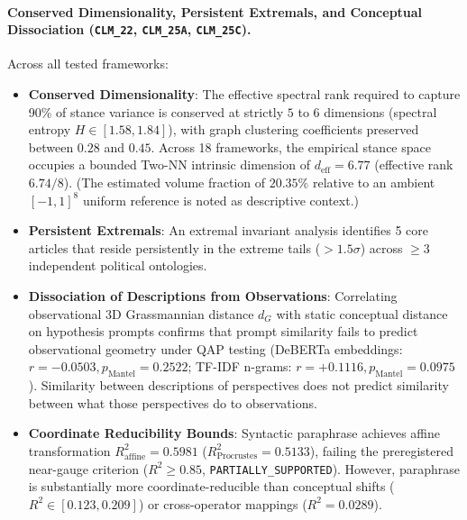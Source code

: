 \paragraph{Conserved Dimensionality, Persistent Extremals, and Conceptual Dissociation (\texttt{CLM\_22}, \texttt{CLM\_25A}, \texttt{CLM\_25C}).}
Across all tested frameworks:
\begin{itemize}
    \item \textbf{Conserved Dimensionality}: The effective spectral rank required to capture 90\% of stance variance is conserved at strictly $5$ to $6$ dimensions (spectral entropy $H \in [1.58, 1.84]$), with graph clustering coefficients preserved between $0.28$ and $0.45$. Across 18 frameworks, the empirical stance space occupies a bounded Two-NN intrinsic dimension of $d_{\text{eff}} = 6.77$ (effective rank $6.74/8$). (The estimated volume fraction of $20.35\%$ relative to an ambient $[-1,1]^8$ uniform reference is noted as descriptive context.)
    \item \textbf{Persistent Extremals}: An extremal invariant analysis identifies 5 core articles that reside persistently in the extreme tails ($> 1.5\sigma$) across $\ge 3$ independent political ontologies.
    \item \textbf{Dissociation of Descriptions from Observations}: Correlating observational 3D Grassmannian distance $d_G$ with static conceptual distance on hypothesis prompts confirms that prompt similarity fails to predict observational geometry under QAP testing (DeBERTa embeddings: $r = -0.0503, p_{\text{Mantel}} = 0.2522$; TF-IDF n-grams: $r = +0.1116, p_{\text{Mantel}} = 0.0975$). Similarity between descriptions of perspectives does not predict similarity between what those perspectives do to observations.
    \item \textbf{Coordinate Reducibility Bounds}: Syntactic paraphrase achieves affine transformation $R^2_{\text{affine}} = 0.5981$ ($R^2_{\text{Procrustes}} = 0.5133$), failing the preregistered near-gauge criterion ($R^2 \ge 0.85$, \texttt{PARTIALLY\_SUPPORTED}). However, paraphrase is substantially more coordinate-reducible than conceptual shifts ($R^2 \in [0.123, 0.209]$) or cross-operator mappings ($R^2 = 0.0289$).
\end{itemize}
